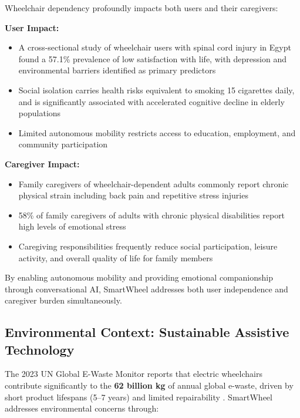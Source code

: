 \documentclass[12pt,a4paper]{report}
\begin{document}
Wheelchair dependency profoundly impacts both users and their caregivers:

\textbf{User Impact:}
\begin{itemize}[leftmargin=*,itemsep=3pt]
    \item A cross-sectional study of wheelchair users with spinal cord injury in Egypt
          found a 57.1\% prevalence of low satisfaction with life, with depression and
          environmental barriers identified as primary predictors \cite{nour_eldein_2024}
    \item Social isolation carries health risks equivalent to smoking 15 cigarettes
          daily, and is significantly associated with accelerated cognitive decline in
          elderly populations \cite{holt_lunstad_2015}
    \item Limited autonomous mobility restricts access to education, employment, and
          community participation
\end{itemize}

\textbf{Caregiver Impact:}
\begin{itemize}[leftmargin=*,itemsep=3pt]
    \item Family caregivers of wheelchair-dependent adults commonly report chronic
          physical strain including back pain and repetitive stress injuries
          \cite{darragh_2015}
    \item 58\% of family caregivers of adults with chronic physical disabilities report
          high levels of emotional stress \cite{darragh_2015}
    \item Caregiving responsibilities frequently reduce social participation, leisure
          activity, and overall quality of life for family members \cite{darragh_2015}
\end{itemize}

By enabling autonomous mobility and providing emotional companionship through conversational
AI, SmartWheel addresses both user independence and caregiver burden simultaneously.

\subsection{Environmental Context: Sustainable Assistive Technology}
The 2023 UN Global E-Waste Monitor reports that electric wheelchairs contribute significantly
to the \textbf{62 billion kg} of annual global e-waste, driven by short product lifespans
(5--7 years) and limited repairability \cite{un_ewaste}. SmartWheel addresses environmental
concerns through:
\end{document}
